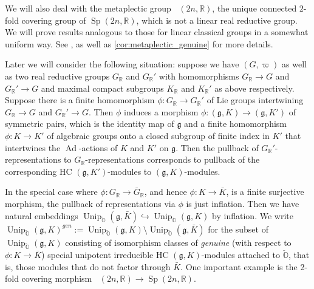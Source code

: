 \documentclass[11pt, a4paper]{amsart}
\newcommand{\g}{\mathfrak{g}}
\newcommand{\orb}{\mathbb{O}}
\newcommand{\fg}{\mathfrak{g}}
\newcommand{\fk}{\mathfrak{k}}
\newcommand{\fu}{\mathfrak{u}}
\newcommand{\ckorb}{\check{\orb}}
\DeclareMathOperator{\Ad}{Ad}
\DeclareMathOperator{\Unip}{Unip}
\DeclareMathOperator{\Mp}{\widetilde{Sp}}
\newcommand{\UnipOv}{\Unip_{\ckorb}}
\newcommand{\Sp}{\operatorname{Sp}}
\newcommand{\R}{\mathbb{R}}
\newcommand{\GR}{G_\R}
\newcommand{\KR}{K_\R}
\theoremstyle{definition}
\numberwithin{equation}{section}
\begin{document}
We will also deal with the metaplectic group $\Mp(2n,\R)$, the unique connected $2$-fold covering group of $\Sp(2n,\R)$, which is not a linear real reductive group. We will prove results analogous to those for linear classical groups in a somewhat uniform way. See , as well as \cref{cor:metaplectic_genuine} for more details.

Later we will consider the following situation: suppose we have $(G, \varpi)$ as well as two real reductive groups $\GR$ and $\GR'$ with homomorphisms $\GR \to G$ and $\GR' \to G$ and maximal compact subgroups $\KR$ and $\KR'$ as above respectively. Suppose there is a finite homomorphism $\phi: \GR \to \GR'$ of Lie groups intertwining $\GR \to G$ and $\GR' \to G$. Then $\phi$ induces a morphism $\phi: (\g, K) \to (\g, K')$ of symmetric pairs, which is the identity map of $\g$ and a finite homomorphism $\phi: K \to K'$ of algebraic groups onto a closed subgroup of finite index in $K'$ that intertwines the $\Ad$-actions of $K$ and $K'$ on $\g$. Then the pullback of $\GR'$-representations to $\GR$-representations corresponds to pullback of the corresponding HC $(\g,K')$-modules to $(\g,K)$-modules.

In the special case where $\phi: \GR \to \bar{G}_\R$, and hence $\phi: K \to \bar{K}$, is a finite surjective morphism, the pullback of representations via $\phi$ is just inflation.
Then we have natural embeddings $\UnipOv(\g, \bar{K}) \hookrightarrow \UnipOv(\g, K)$ by inflation. 
We write $\UnipOv(\g,K)^{gen} := \UnipOv(\g,K) \setminus \UnipOv(\g, \bar{K})$ for the subset of $\UnipOv(\g,K)$ consisting of isomorphism classes of \emph{genuine} (with respect to $\phi: K \to \bar{K}$) special unipotent irreducible HC $(\g,K)$-modules attached to $\ckorb$, that is, those modules that do not factor through $\bar{K}$. One important example is the 2-fold covering morphism $\Mp(2n,\R) \to \Sp(2n,\R)$.



\end{document}
